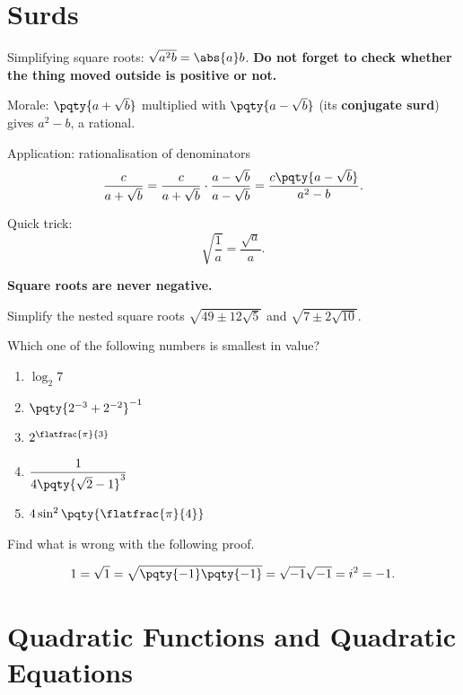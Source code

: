 \documentclass{article}
\begin{document}
\section{Surds}

Simplifying square roots: \(\sqrt{a^2 b} = \abs{a} b\). \textbf{Do not forget to check whether the thing moved outside is positive or not.}

Morale: \(\pqty{a + \sqrt{b}}\) multiplied with \(\pqty{a - \sqrt{b}}\) (its \textbf{conjugate surd}) gives \(a^2 - b\), a rational.

Application: rationalisation of denominators
\[
    \frac{c}{a + \sqrt{b}} = \frac{c}{a + \sqrt{b}} \cdot \frac{a - \sqrt{b}}{a - \sqrt{b}} = \frac{c \pqty{a - \sqrt{b}}}{a^2 - b}.
\]

Quick trick:
\[
    \sqrt{\frac{1}{a}} = \frac{\sqrt{a}}{a}.
\]

\textbf{Square roots are never negative.}

\begin{example}
    Simplify the nested square roots \(\sqrt{49 \pm 12 \sqrt{5}}\) and \(\sqrt{7 \pm 2 \sqrt{10}}\).
\end{example}

\begin{example}[TMUA 2017 P2 Q8]
    Which one of the following numbers is smallest in value?

    \begin{enumerate}
        \item \(\log_2 7\)
        \item \(\pqty{2^{-3} + 2^{-2}}^{-1}\)
        \item \(2^{\flatfrac{\pi}{3}}\)
        \item \(\dfrac{1}{4\pqty{\sqrt{2} - 1}^3}\)
        \item \(4 \sin^2 \pqty{\flatfrac{\pi}{4}}\)
    \end{enumerate}
\end{example}

\begin{problem}
    Find what is wrong with the following proof.

    \[
        1 = \sqrt{1} = \sqrt{\pqty{-1} \pqty{-1}} = \sqrt{-1} \sqrt{-1} = i^2 = -1.
    \]  
\end{problem}

\section{Quadratic Functions and Quadratic Equations}
\end{document}
